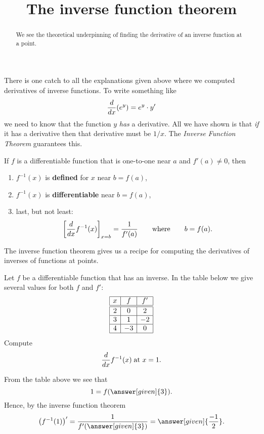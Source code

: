 \documentclass{ximera}
\title[Dig-In:]{The inverse function theorem}
\begin{document}
\begin{abstract}
  We see the theoretical underpinning of finding the derivative of an
  inverse function at a point.
\end{abstract}
\maketitle

There is one catch to all the explanations given above where we
computed derivatives of inverse functions. To write something like
\[
\frac{d}{dx}(e^y)=e^y\cdot y'
\]
we need to know that the function $y$ \textit{has} a derivative. All
we have shown is that \textit{if} it has a derivative then that
derivative must be $1/x$. The \textit{Inverse Function Theorem}
guarantees this.

\begin{theorem}\label{theorem:IFT}
If $f$ is a differentiable function that is one-to-one near $a$ and
$f'(a) \neq 0$, then
\begin{enumerate}
\item $f^{-1}(x)$ is \textbf{defined} for $x$ near $b=f(a)$,
\item $f^{-1}(x)$ is \textbf{differentiable} near $b=f(a)$, 
\item last, but not least:
  \[
  \bigg[ \frac{d}{dx} f^{-1}(x) \bigg]_{x=b}  = \frac{1}{f'(a)}\qquad\text{where}\qquad b = f(a).
  \]
\end{enumerate}
\end{theorem}

The inverse function theorem gives us a recipe for computing the
derivatives of inverses of functions at points.

\begin{example}
  Let $f$ be a differentiable function that has an inverse. In the
  table below we give several values for both $f$ and $f'$:
  \[
  \begin{array}{|c|c|c|}\hline
    x & f  & f' \\ \hline \hline
    2 & 0  & 2  \\ \hline
    3 & 1  & -2 \\ \hline
    4 & -3 & 0  \\ \hline
  \end{array}
  \]
  Compute
  \[
  \frac{d}{dx} f^{-1}(x)\;\text{at $x=1$.}
  \]
  \begin{explanation}
    From the table above we see that
    \[
    1 = f(\answer[given]{3}).
    \]
    Hence, by the inverse function theorem
    \[
    \left(f^{-1}(1)\right)' = \frac{1}{f'(\answer[given]{3})} = \answer[given]{\frac{-1}{2}}.
    \]
  \end{explanation}
\end{example}
\end{document}
